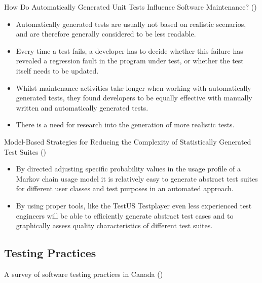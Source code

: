 \documentclass[]{book}
\providecommand{\tightlist}{%
  \setlength{\itemsep}{0pt}\setlength{\parskip}{0pt}}
\begin{document}
How Do Automatically Generated Unit Tests Influence Software
Maintenance? (\citet{shamshiri2018automatically})

\begin{itemize}
\tightlist
\item
  Automatically generated tests are usually not based on realistic
  scenarios, and are therefore generally considered to be less readable.
\item
  Every time a test fails, a developer has to decide whether this
  failure has revealed a regression fault in the program under test, or
  whether the test itself needs to be updated.
\item
  Whilst maintenance activities take longer when working with
  automatically generated tests, they found developers to be equally
  effective with manually written and automatically generated tests.
\item
  There is a need for research into the generation of more realistic
  tests.
\end{itemize}

Model-Based Strategies for Reducing the Complexity of Statistically
Generated Test Suites (\citet{dulz2013model})

\begin{itemize}
\tightlist
\item
  By directed adjusting specific probability values in the usage profile
  of a Markov chain usage model it is relatively easy to generate
  abstract test suites for different user classes and test purposes in
  an automated approach.
\item
  By using proper tools, like the TestUS Testplayer even less
  experienced test engineers will be able to efficiently generate
  abstract test cases and to graphically assess quality characteristics
  of different test suites.
\end{itemize}

\subsection{Testing Practices}\label{testing-practices}

A survey of software testing practices in Canada
(\citet{GAROUSI20131354})
\end{document}
